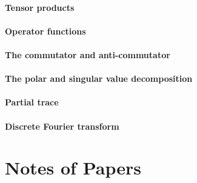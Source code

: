 \documentclass[
	11pt, %
	fleqn, %
	a4paper, %
]{LegrandOrangeBook}
\begin{document}
\subsection{Tensor products}


\subsection{Operator functions}


\subsection{The commutator and anti-commutator}


\subsection{The polar and singular value decomposition}


\subsection{Partial trace}


\subsection{Discrete Fourier transform}




\part{Notes of Papers}

\end{document}
